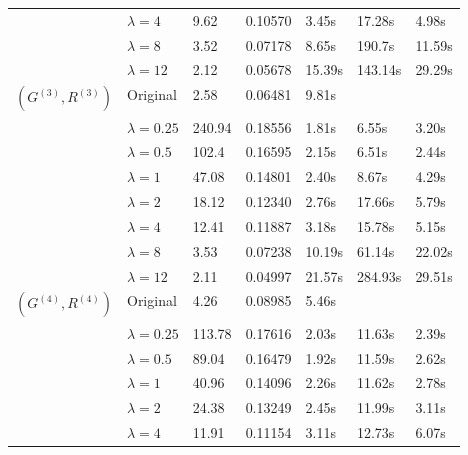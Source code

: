 \documentclass[11pt,a4paper,openright,oneside]{book}
\numberwithin{equation}{section}
\begin{document}
{\begin{figure}[h]
\begin{adjustwidth}{-30pt}{-30pt}
\begin{tabular}{lllllll}
                     & $\lambda = 4$    & 9.62   & 0.10570    & 3.45s  & 17.28s            & 4.98s              \\
                     & $\lambda = 8$    & 3.52   & 0.07178    & 8.65s  & 190.7s            & 11.59s             \\
                     & $\lambda = 12$   & 2.12   & 0.05678    & 15.39s & 143.14s           & 29.29s             \\ \hline
$(G^{(3)}, R^{(3)})$ & Original         & 2.58   & 0.06481    & 9.81s  &                   &                    \\
                     & $\lambda = 0.25$ & 240.94 & 0.18556    & 1.81s  & 6.55s             & 3.20s              \\
                     & $\lambda = 0.5$  & 102.4  & 0.16595    & 2.15s  & 6.51s             & 2.44s              \\
                     & $\lambda = 1$    & 47.08  & 0.14801    & 2.40s  & 8.67s             & 4.29s              \\
                     & $\lambda = 2$    & 18.12  & 0.12340    & 2.76s  & 17.66s            & 5.79s              \\
                     & $\lambda = 4$    & 12.41  & 0.11887    & 3.18s  & 15.78s            & 5.15s              \\
                     & $\lambda = 8$    & 3.53   & 0.07238    & 10.19s & 61.14s            & 22.02s             \\
                     & $\lambda = 12$   & 2.11   & 0.04997    & 21.57s & 284.93s           & 29.51s             \\ \hline
$(G^{(4)}, R^{(4)})$ & Original         & 4.26   & 0.08985    & 5.46s  &                   &                    \\
                     & $\lambda = 0.25$ & 113.78 & 0.17616    & 2.03s  & 11.63s            & 2.39s              \\
                     & $\lambda = 0.5$  & 89.04  & 0.16479    & 1.92s  & 11.59s            & 2.62s              \\
                     & $\lambda = 1$    & 40.96  & 0.14096    & 2.26s  & 11.62s            & 2.78s              \\
                     & $\lambda = 2$    & 24.38  & 0.13249    & 2.45s  & 11.99s            & 3.11s              \\
                     & $\lambda = 4$    & 11.91  & 0.11154    & 3.11s  & 12.73s            & 6.07s              \\

\end{tabular}
\end{adjustwidth}
\end{figure}}
\end{document}
